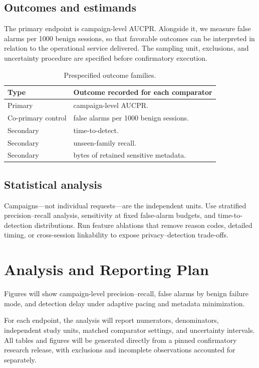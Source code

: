 \documentclass[11pt,a4paper]{article}
\begin{document}
\subsection{Outcomes and estimands}
The primary endpoint is campaign-level AUCPR. Alongside it, we measure false alarms per 1000 benign sessions, so that favorable outcomes can be interpreted in relation to the operational service delivered. The sampling unit, exclusions, and uncertainty procedure are specified before confirmatory execution.
\begin{table}[ht]
\centering\footnotesize
\caption{Prespecified outcome families.}
\begin{tabularx}{\linewidth}{@{}lX@{}}\toprule
Type & Outcome recorded for each comparator \\ \midrule
Primary & campaign-level AUCPR. \\ 
Co-primary control & false alarms per 1000 benign sessions. \\ 
Secondary & time-to-detect. \\ 
Secondary & unseen-family recall. \\ 
Secondary & bytes of retained sensitive metadata. \\ 
\bottomrule\end{tabularx}
\end{table}

\subsection{Statistical analysis}
Campaigns—not individual requests—are the independent units. Use stratified precision–recall analysis, sensitivity at fixed false-alarm budgets, and time-to-detection distributions. Run feature ablations that remove reason codes, detailed timing, or cross-session linkability to expose privacy–detection trade-offs.

\section{Analysis and Reporting Plan}
Figures will show campaign-level precision–recall, false alarms by benign failure mode, and detection delay under adaptive pacing and metadata minimization.

For each endpoint, the analysis will report numerators, denominators, independent study units, matched comparator settings, and uncertainty intervals. All tables and figures will be generated directly from a pinned confirmatory research release, with exclusions and incomplete observations accounted for separately.
\end{document}
